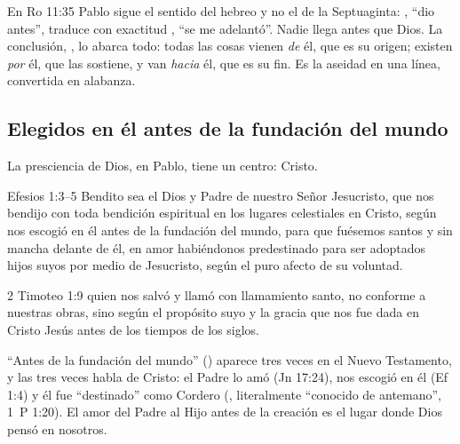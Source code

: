 En Ro 11:35 Pablo sigue el sentido del hebreo y no el de la Septuaginta: , ``dio antes'', traduce con exactitud , ``se me adelantó''. Nadie llega antes que Dios. La conclusión, , lo abarca todo: todas las cosas vienen \emph{de} él, que es su origen; existen \emph{por} él, que las sostiene, y van \emph{hacia} él, que es su fin. Es la aseidad en una línea, convertida en alabanza.


\subsection{Elegidos en él antes de la fundación del mundo}
La presciencia de Dios, en Pablo, tiene un centro: Cristo.

\begin{verso}{Efesios 1:3–5}
Bendito sea el Dios y Padre de nuestro Señor Jesucristo, que nos bendijo con toda bendición espiritual en los lugares celestiales en Cristo, según nos escogió en él antes de la fundación del mundo, para que fuésemos santos y sin mancha delante de él, en amor habiéndonos predestinado para ser adoptados hijos suyos por medio de Jesucristo, según el puro afecto de su voluntad.
\end{verso}
\begin{verso}{2 Timoteo 1:9}
quien nos salvó y llamó con llamamiento santo, no conforme a nuestras obras, sino según el propósito suyo y la gracia que nos fue dada en Cristo Jesús antes de los tiempos de los siglos.
\end{verso}

``Antes de la fundación del mundo'' () aparece tres veces en el Nuevo Testamento, y las tres veces habla de Cristo: el Padre lo amó (Jn 17:24), nos escogió en él (Ef 1:4) y él fue ``destinado'' como Cordero (, literalmente ``conocido de antemano'', 1~P 1:20). El amor del Padre al Hijo antes de la creación es el lugar donde Dios pensó en nosotros.


